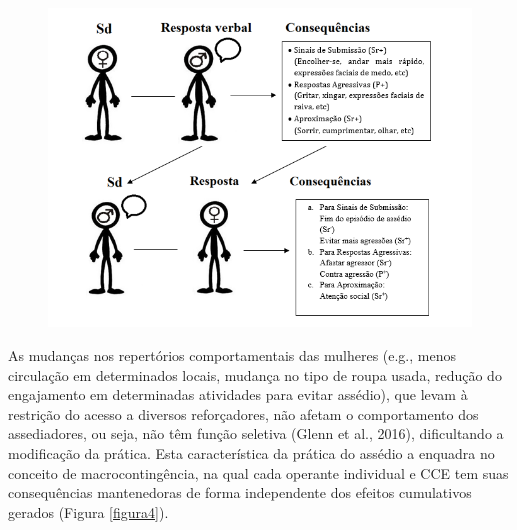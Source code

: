 \begin{figure}[ht]
    \begin{center}
        \includegraphics[width=1\textwidth]{7/figura3}
        \label{figura3}
\end{center}
\end{figure}

As mudanças nos repertórios comportamentais das mulheres (e.g., menos circulação em determinados locais, mudança no tipo de roupa usada, redução do engajamento em determinadas atividades para evitar assédio), que levam à restrição do acesso a diversos reforçadores, não afetam o comportamento dos assediadores, ou seja, não têm função seletiva (Glenn et al., 2016), dificultando a modificação da prática. Esta característica da prática do assédio a enquadra no conceito de macrocontingência, na qual cada operante individual e CCE tem suas consequências mantenedoras de forma independente dos efeitos cumulativos gerados (Figura \ref{figura4}).

